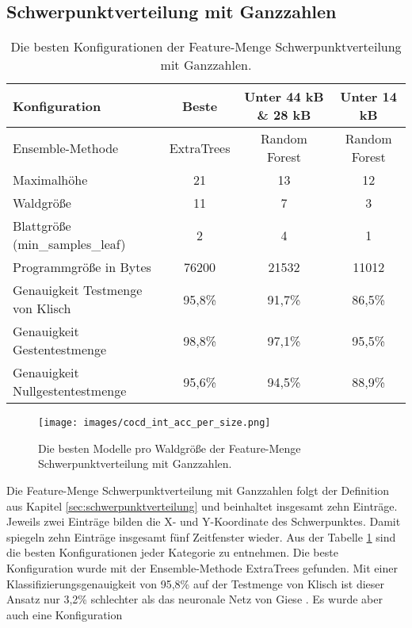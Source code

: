 \subsection{Schwerpunktverteilung mit Ganzzahlen}
\begin{table}[h!]
    \hspace{-0.5cm}
    \begin{tabular}{ | l | c | c | c |}
        \hline
        Konfiguration & Beste & Unter 44 kB \& 28 kB & Unter 14 kB \\\hline
        Ensemble-Methode & ExtraTrees & Random Forest & Random Forest \\\hline
        Maximalhöhe & 21 & 13 & 12 \\\hline
        Waldgröße & 11 & 7 & 3 \\\hline
        Blattgröße (min\_samples\_leaf) & 2 & 4 & 1 \\\hline
        Programmgröße in Bytes & 76200 & 21532 & 11012 \\\hline
        Genauigkeit Testmenge von Klisch & 95,8\% & 91,7\% & 86,5\% \\\hline
        Genauigkeit Gestentestmenge & 98,8\% & 97,1\% & 95,5\% \\\hline
        Genauigkeit Nullgestentestmenge & 95,6\% & 94,5\% & 88,9\% \\\hline
    \end{tabular}
    \caption{Die besten Konfigurationen der Feature-Menge Schwerpunktverteilung mit Ganzzahlen.}
    \label{tab:schwerpunktverteilung_int}
\end{table}
\begin{figure}[h!]
    \centering
    \texttt{[image: images/cocd\_int\_acc\_per\_size.png]}
    \caption{Die besten Modelle pro Waldgröße der Feature-Menge Schwerpunktverteilung mit Ganzzahlen.}
    \label{fig:cocd_int_per_forest_size}
\end{figure}
Die Feature-Menge Schwerpunktverteilung mit Ganzzahlen folgt der Definition aus Kapitel \ref{sec:schwerpunktverteilung} und beinhaltet insgesamt zehn Einträge. Jeweils zwei Einträge bilden die
X- und Y-Koordinate des Schwerpunktes. Damit spiegeln zehn Einträge insgesamt fünf Zeitfenster wieder.
\newline
\newline
Aus der Tabelle \ref{tab:schwerpunktverteilung_int} sind die besten Konfigurationen jeder Kategorie zu entnehmen. Die beste Konfiguration wurde mit der Ensemble-Methode ExtraTrees gefunden.
Mit einer Klassifizierungsgenauigkeit von 95,8\% auf der Testmenge von Klisch ist dieser Ansatz nur 3,2\% schlechter als das neuronale Netz von Giese \cite{gieseThesis}. Es wurde aber auch eine Konfiguration

